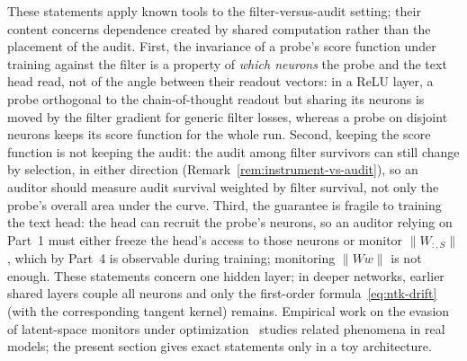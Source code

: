 \begin{remark}
These statements apply known tools to the filter-versus-audit setting; their content concerns dependence created by shared computation rather than the placement of the audit. First, the invariance of a probe's score function under training against the filter is a property of \emph{which neurons} the probe and the text head read, not of the angle between their readout vectors: in a ReLU layer, a probe orthogonal to the chain-of-thought readout but sharing its neurons is moved by the filter gradient for generic filter losses, whereas a probe on disjoint neurons keeps its score function for the whole run. Second, keeping the score function is not keeping the audit: the audit among filter survivors can still change by selection, in either direction (Remark~\ref{rem:instrument-vs-audit}), so an auditor should measure audit survival weighted by filter survival, not only the probe's overall area under the curve. Third, the guarantee is fragile to training the text head: the head can recruit the probe's neurons, so an auditor relying on Part~1 must either freeze the head's access to those neurons or monitor $\|W_{:,S}\|$, which by Part~4 is observable during training; monitoring $\|Ww\|$ is not enough. These statements concern one hidden layer; in deeper networks, earlier shared layers couple all neurons and only the first-order formula~\eqref{eq:ntk-drift} (with the corresponding tangent kernel) remains. Empirical work on the evasion of latent-space monitors under optimization~\cite{bailey2024,gupta2025} studies related phenomena in real models; the present section gives exact statements only in a toy architecture.
\end{remark}

